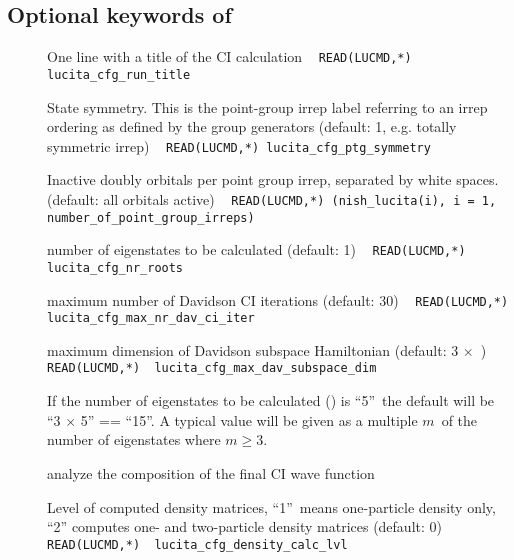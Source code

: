 \subsection{Optional keywords of }\label{sec:lucita-inp-opt}

\begin{description}
\item[] One line with a title of the CI calculation \verb| |\newline
\verb|READ(LUCMD,*) lucita_cfg_run_title |

\item[] State symmetry. This is the point-group irrep label 
referring to an irrep ordering as defined by the group generators (default: 1, e.g. totally symmetric irrep)  \verb| |\newline
\verb|READ(LUCMD,*) lucita_cfg_ptg_symmetry |

\item[] Inactive doubly orbitals per point group irrep, 
separated by white spaces. (default: all orbitals active) \verb| |\newline
\verb|READ(LUCMD,*) (nish_lucita(i), i = 1, number_of_point_group_irreps) |

\item[] number of eigenstates to be calculated (default: 1) \verb| |\newline
\verb|READ(LUCMD,*) lucita_cfg_nr_roots |

\item[] maximum number of Davidson CI iterations (default: 30) \verb| |\newline
\verb|READ(LUCMD,*) lucita_cfg_max_nr_dav_ci_iter |

\item[] maximum dimension of Davidson subspace Hamiltonian (default: 3 $\times$\ )\newline
\verb|READ(LUCMD,*)  lucita_cfg_max_dav_subspace_dim|

If the number of eigenstates to be calculated () is ``5''\ 
the default will be\\ ``3 $\times$ 5'' == ``15''. A typical value will 
be given as a multiple $m$\ of the number of eigenstates where $m \geq 3$.

\item[] analyze the composition of the final CI wave function \newline

\item[]  Level of computed density matrices, ``1''\ means one-particle density only, ``2'' computes one- and two-particle density matrices (default: 0) \verb| |\newline
\verb|READ(LUCMD,*)  lucita_cfg_density_calc_lvl |


\end{description}
